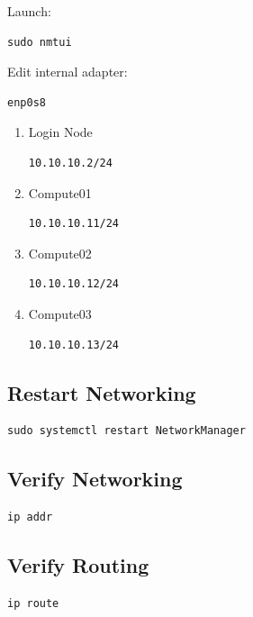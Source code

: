 \documentclass[11pt]{article}
\begin{document}
Launch:

\begin{verbatim}
sudo nmtui
\end{verbatim}

Edit internal adapter:

\begin{verbatim}
enp0s8
\end{verbatim}
\begin{enumerate}
\item Login Node
\label{sec:org0325b14}

\begin{verbatim}
10.10.10.2/24
\end{verbatim}
\item Compute01
\label{sec:org463caf1}

\begin{verbatim}
10.10.10.11/24
\end{verbatim}
\item Compute02
\label{sec:orgef40429}

\begin{verbatim}
10.10.10.12/24
\end{verbatim}
\item Compute03
\label{sec:orga81a57c}

\begin{verbatim}
10.10.10.13/24
\end{verbatim}
\end{enumerate}
\subsection{Restart Networking}
\label{sec:orga45abc2}

\begin{verbatim}
sudo systemctl restart NetworkManager
\end{verbatim}
\subsection{Verify Networking}
\label{sec:orgd194c61}

\begin{verbatim}
ip addr
\end{verbatim}
\subsection{Verify Routing}
\label{sec:org4563054}

\begin{verbatim}
ip route
\end{verbatim}
\end{document}
